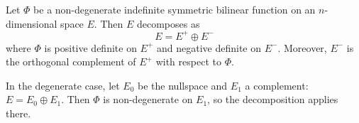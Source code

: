 Let $\Phi$ be a non-degenerate indefinite symmetric bilinear function on an $n$-dimensional space $E$. Then $E$ decomposes as
$$E = E^+ \oplus E^-$$
where $\Phi$ is positive definite on $E^+$ and negative definite on $E^-$. Moreover, $E^-$ is the orthogonal complement of $E^+$ with respect to $\Phi$.

In the degenerate case, let $E_0$ be the nullspace and $E_1$ a complement: $E = E_0 \oplus E_1$. Then $\Phi$ is non-degenerate on $E_1$, so the decomposition applies there.
